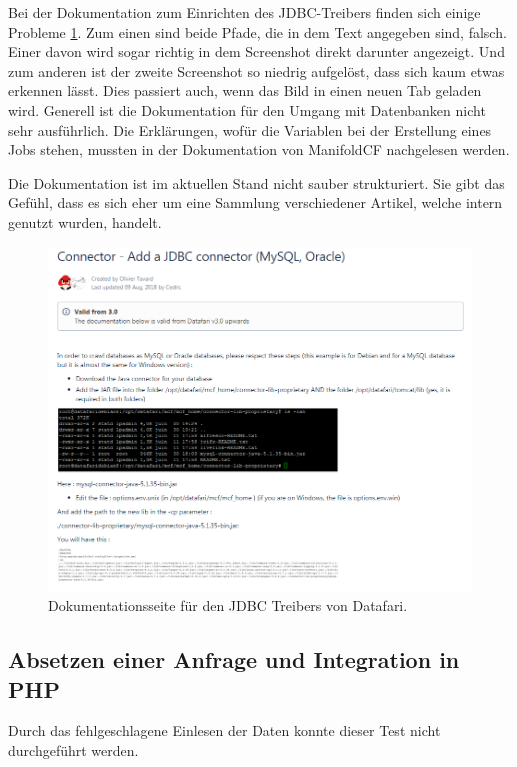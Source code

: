 Bei der Dokumentation zum Einrichten des JDBC-Treibers finden sich einige Probleme \ref{img:datafariJDBC}. Zum einen sind beide Pfade, die in dem Text angegeben sind, falsch. Einer davon wird sogar richtig in dem Screenshot direkt darunter angezeigt. Und zum anderen ist der zweite Screenshot so niedrig aufgelöst, dass sich kaum etwas erkennen lässt. Dies passiert auch, wenn das Bild in einen neuen Tab geladen wird. Generell ist die Dokumentation für den Umgang mit Datenbanken nicht sehr ausführlich. Die Erklärungen, wofür die Variablen bei der Erstellung eines Jobs stehen, mussten in der Dokumentation von ManifoldCF nachgelesen werden.

Die Dokumentation ist im aktuellen Stand nicht sauber strukturiert. Sie gibt das Gefühl, dass es sich eher um eine Sammlung verschiedener Artikel, welche intern genutzt wurden, handelt.

\begin{figure}
	\centering
	\includegraphics[width=1\linewidth]{images/datafari_doku_wrong_path.png}
	\caption{Dokumentationsseite für den JDBC Treibers von Datafari.}
	\label{img:datafariJDBC}
\end{figure}


\subsection{Absetzen einer Anfrage und Integration in PHP}

Durch das fehlgeschlagene Einlesen der Daten konnte dieser Test nicht durchgeführt werden.
